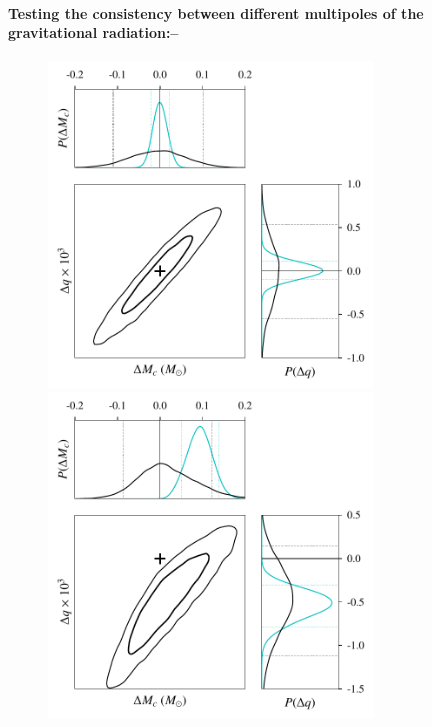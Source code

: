 \documentclass[prl,preprintnumbers,twocolumn,eqsecnum,floatfix,a4paper,nofootinbib,superscriptaddress]{revtex4}
\begin{document}
\paragraph{Testing the consistency between different multipoles of the gravitational radiation:--}

\begin{figure}[htb] \begin{center}
\includegraphics[width=3.4in]{figs/fig1_GR.pdf}
\includegraphics[width=3.4in]{figs/fig1_modGR.pdf}

\end{center}
\end{figure}
\end{document}
